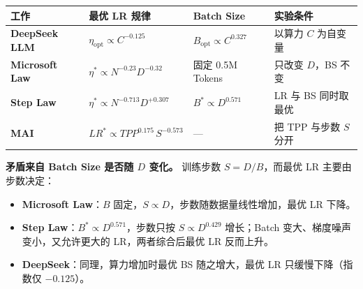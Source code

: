 \documentclass[
  11pt,
  a4paper,
  fontset=none]{ctexart}
\newcounter{none} %
\providecommand{\tightlist}{%
  \setlength{\itemsep}{0pt}\setlength{\parskip}{0pt}}
\begin{document}
{\def\LTcaptype{none} %
\begin{longtable}[]{@{}
  >{\centering\arraybackslash}p{}
  >{\centering\arraybackslash}p{}
  >{\centering\arraybackslash}p{}
  >{\centering\arraybackslash}p{}@{}}
\toprule\noalign{}
\begin{minipage}[b]{\linewidth}\centering
\textbf{工作}
\end{minipage} & \begin{minipage}[b]{\linewidth}\centering
\textbf{最优 LR 规律}
\end{minipage} & \begin{minipage}[b]{\linewidth}\centering
\textbf{Batch Size}
\end{minipage} & \begin{minipage}[b]{\linewidth}\centering
\textbf{实验条件}
\end{minipage} \\
\midrule\noalign{}
\endhead
\bottomrule\noalign{}
\endlastfoot
\textbf{DeepSeek LLM} & \(\eta_{\mathrm{opt}}\propto C^{-0.125}\) &
\(B_{\mathrm{opt}}\propto C^{0.327}\) & 以算力 \(C\) 为自变量 \\
\textbf{Microsoft Law} & \(\eta^*\propto N^{-0.23}D^{-0.32}\) & 固定
0.5M Tokens & 只改变 \(D\)，BS 不变 \\
\textbf{Step Law} & \(\eta^*\propto N^{-0.713}D^{+0.307}\) &
\(B^*\propto D^{0.571}\) & LR 与 BS 同时取最优 \\
\textbf{MAI} & \(LR^*\propto TPP^{0.175}\,S^{-0.573}\) & --- & 把 TPP
与步数 \(S\) 分开 \\
\end{longtable}
}

\textbf{矛盾来自 Batch Size 是否随 \(D\) 变化。} 训练步数
\(S=D/B\)，而最优 LR 主要由步数决定：

\begin{itemize}
\tightlist
\item
  \textbf{Microsoft Law}：\(B\)
  固定，\(S\propto D\)，步数随数据量线性增加，最优 LR 下降。
\item
  \textbf{Step Law}：\(B^*\propto D^{0.571}\)，步数只按
  \(S\propto D^{0.429}\) 增长；Batch 变大、梯度噪声变小，又允许更大的
  LR，两者综合后最优 LR 反而上升。
\item
  \textbf{DeepSeek}：同理，算力增加时最优 BS 随之增大，最优 LR
  只缓慢下降（指数仅 \(-0.125\)）。
\end{itemize}
\end{document}
